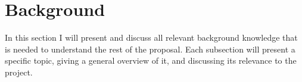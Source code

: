 \section{Background}
\label{sec:background}

In this section I will present and discuss all relevant background knowledge that is needed to understand the rest of the proposal.
Each subsection will present a specific topic, giving a general overview of it, and discussing its relevance to the project.






